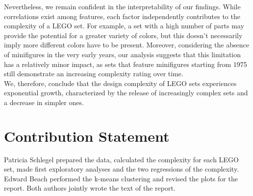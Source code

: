 \documentclass{article}
\theoremstyle{plain}
\theoremstyle{definition}
\theoremstyle{remark}
\begin{document}
	Nevertheless, we remain confident in the interpretability of our findings. While correlations exist among features, each factor independently contributes to the complexity of a LEGO set. For example, a set with a high number of parts may provide the potential for a greater variety of colors, but this doesn't necessarily imply more different colors have to be present. Moreover, considering the absence of minifigures in the very early years, our analysis suggests that this limitation has a relatively minor impact, as sets that feature minifigures starting from 1975 still demonstrate an increasing complexity rating over time. \\
	We, therefore, conclude that the design complexity of LEGO sets experiences exponential growth, characterized by the release of increasingly complex sets and a decrease in simpler ones.
	
	
	
	\section*{Contribution Statement}
	
	Patricia Schlegel prepared the data, calculated the complexity for each LEGO set, made first exploratory analyses and the two regressions of the complexity. Edward Beach performed the k-means clustering and revised the plots for the report. Both authors jointly wrote the text of the report.
	
	
	
	
	
\end{document}

